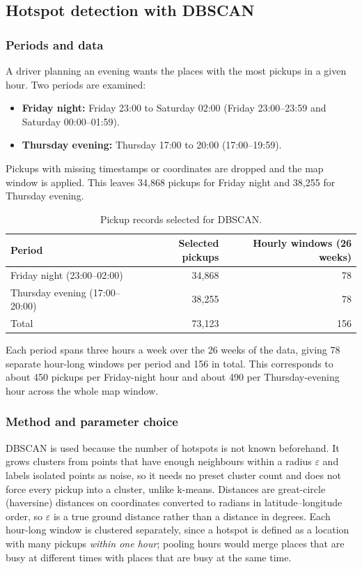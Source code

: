 \documentclass[11pt,a4paper]{article}
\begin{document}
\subsection{Hotspot detection with DBSCAN}
\label{sec:dbscan}

\subsubsection{Periods and data}

A driver planning an evening wants the places with the most pickups in a given hour. Two periods are examined:
\begin{itemize}
    \item \textbf{Friday night:} Friday 23:00 to Saturday 02:00 (Friday 23:00--23:59 and Saturday 00:00--01:59).
    \item \textbf{Thursday evening:} Thursday 17:00 to 20:00 (17:00--19:59).
\end{itemize}
Pickups with missing timestamps or coordinates are dropped and the map window is applied. This leaves 34,868 pickups for Friday night and 38,255 for Thursday evening.

\begin{table}[H]
\centering
\caption{Pickup records selected for DBSCAN.}
\begin{tabular}{lrr}
\toprule
Period & Selected pickups & Hourly windows (26 weeks) \\
\midrule
Friday night (23:00--02:00) & 34,868 & 78 \\
Thursday evening (17:00--20:00) & 38,255 & 78 \\
\midrule
Total & 73,123 & 156 \\
\bottomrule
\end{tabular}
\end{table}

Each period spans three hours a week over the 26 weeks of the data, giving 78 separate hour-long windows per period and 156 in total. This corresponds to about 450 pickups per Friday-night hour and about 490 per Thursday-evening hour across the whole map window.

\subsubsection{Method and parameter choice}

DBSCAN is used because the number of hotspots is not known beforehand. It grows clusters from points that have enough neighbours within a radius $\varepsilon$ and labels isolated points as noise, so it needs no preset cluster count and does not force every pickup into a cluster, unlike k-means. Distances are great-circle (haversine) distances on coordinates converted to radians in latitude--longitude order, so $\varepsilon$ is a true ground distance rather than a distance in degrees. Each hour-long window is clustered separately, since a hotspot is defined as a location with many pickups \emph{within one hour}; pooling hours would merge places that are busy at different times with places that are busy at the same time.
\end{document}
